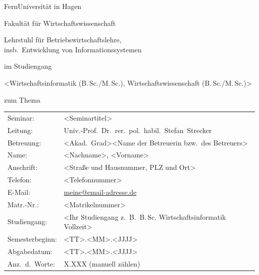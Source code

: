 \documentclass[%
draft=false,%
paper=a4,%
fontsize=12pt,%
pagesize=auto,%
twoside=false,%
headings=small,openany,%
chapterprefix=false,%
version=last,%
titlepage=true,%
parskip=half+,%
mpinclude=false,%
headsepline=true,%
numbers=noendperiod%
]{scrbook}
\makeatletter
\newcommand{\MSc}{M.\,Sc.\@\xspace}
\newcommand{\BSc}{B.\,Sc.\@\xspace}
\makeatother
\begin{document}
\frontmatter

\begin{titlepage}
\thispagestyle{empty}

\begin{center}
	\noindent\Huge FernUniversität in Hagen
	
	\bigskip
	
	\noindent\huge Fakultät für Wirtschaftswissenschaft
	
	\bigskip
	
	\noindent\normalsize Lehrstuhl für Betriebswirtschaftslehre,\\
	\noindent\normalsize insb.\ Entwicklung von Informationssystemen
	
	\vspace{3cm}
	
	\noindent\normalsize <Seminar-, Bachelor-, Masterarbeit>
	
	\smallskip
	
	\noindent\normalsize im Studiengang
	
	\smallskip
	
	\noindent\normalsize <Wirtschaftsinformatik (\BSc/\MSc), Wirtschaftswissenschaft (\BSc/\MSc)>
	
	\smallskip
	
	\noindent\normalsize zum Thema
	
	\bigskip
		
	\begin{shaded}
	\end{shaded}	
	
	\vspace{2cm}
\end{center}

	\begin{tabular}{ll}
		Seminar:	&	<Seminartitel> \\
		Leitung:	&	Univ.-Prof.\ Dr.\ rer.\ pol.\ habil.\ Stefan~Strecker \\
		Betreuung:  &	<Akad.\ Grad><Name der Betreuerin bzw.\ des Betreuers>\\
		Name:		&	<Nachname>, <Vorname>\\
		Anschrift:	&	<Straße und Hausnummer, PLZ und Ort>\\
		Telefon:	&	<Telefonnummer>\\
		E-Mail:		&	\href{mailto:meine@email-adresse.de}{meine@email-adresse.de}\\
		Matr.-Nr.:	& 	<Matrikelnummer>\\
		Studiengang:	&	<Ihr Studiengang z.\ B.\ \BSc Wirtschaftsinformatik Vollzeit>\\
		Semesterbeginn:	&	<TT>.<MM>.<JJJJ> \\
		Abgabedatum:	&	<TT>.<MM>.<JJJJ> \\
		Anz.\ d.\ Worte:	&	X.XXX (manuell zählen)\\	
	\end{tabular}
	


\end{titlepage}
\end{document}
